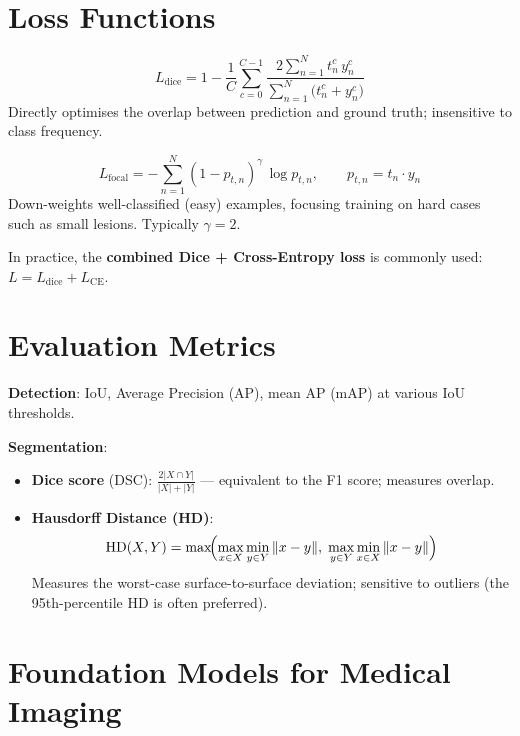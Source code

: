 \documentclass[12pt,a4paper]{report}
\begin{document}
\section{Loss Functions}

\begin{formulabox}
\[
    L_{\text{dice}} = 1 - \frac{1}{C}\sum_{c=0}^{C-1}
    \frac{2\sum_{n=1}^{N} t_n^c\,y_n^c}
         {\sum_{n=1}^{N}\bigl(t_n^c + y_n^c\bigr)}
\]
Directly optimises the overlap between prediction and ground truth;
insensitive to class frequency.
\end{formulabox}

\begin{formulabox}
\[
    L_{\text{focal}}
    = -\sum_{n=1}^{N}(1 - p_{t,n})^{\gamma}\,\log p_{t,n},
    \qquad p_{t,n} = t_n \cdot y_n
\]
Down-weights well-classified (easy) examples, focusing training on hard
cases such as small lesions.  Typically $\gamma = 2$.
\end{formulabox}

In practice, the \textbf{combined Dice + Cross-Entropy loss} is commonly used:
$L = L_{\text{dice}} + L_{\text{CE}}$.

\section{Evaluation Metrics}

\textbf{Detection}: IoU, Average Precision (AP), mean AP (mAP) at various
IoU thresholds.

\textbf{Segmentation}:

\begin{itemize}[itemsep=1pt]
    \item \textbf{Dice score} (DSC): $\frac{2|X\cap Y|}{|X|+|Y|}$
          — equivalent to the F1 score; measures overlap.
    \item \textbf{Hausdorff Distance (HD)}:
          \[
              \mathrm{HD}(X,Y)
              = \max\!\Bigl(\max_{x\in X}\min_{y\in Y}\|x-y\|,\;
                            \max_{y\in Y}\min_{x\in X}\|x-y\|\Bigr)
          \]
          Measures the worst-case surface-to-surface deviation; sensitive to
          outliers (the 95th-percentile HD is often preferred).
\end{itemize}

\section{Foundation Models for Medical Imaging}
\end{document}

